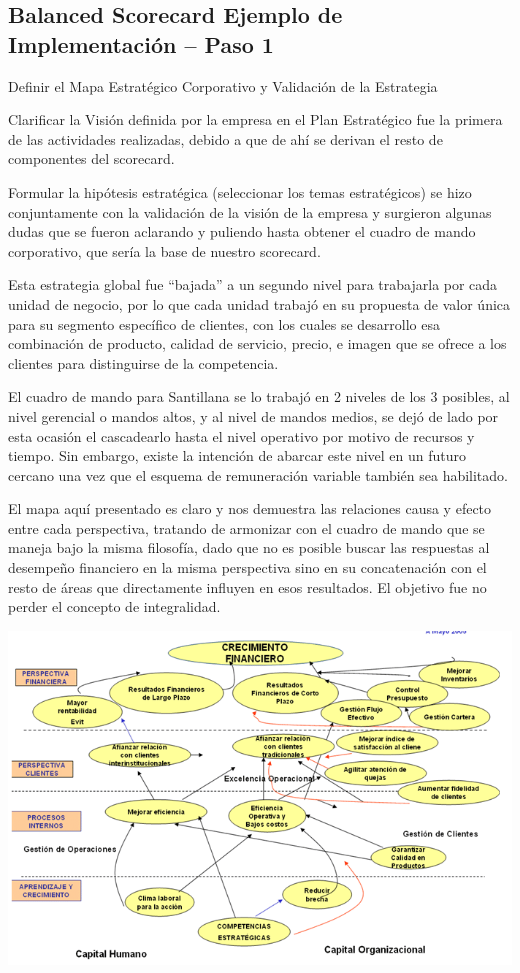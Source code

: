 \subsection{Balanced Scorecard Ejemplo de Implementación – Paso 1}
\item {Definir el Mapa Estratégico Corporativo y Validación de la Estrategia

Clarificar la Visión definida por la empresa en el Plan Estratégico fue la primera de las actividades realizadas, debido a que de ahí se derivan el resto de componentes del scorecard.

Formular la hipótesis estratégica (seleccionar los temas estratégicos) se hizo conjuntamente con la validación de la visión de la empresa y surgieron algunas dudas que se fueron aclarando y puliendo hasta obtener el cuadro de mando corporativo, que sería la base de nuestro scorecard.

Esta estrategia global fue “bajada” a un segundo nivel para trabajarla por cada unidad de negocio, por lo que cada unidad trabajó en su propuesta de valor única para su segmento específico de clientes, con los cuales se desarrollo esa combinación de producto, calidad de servicio, precio, e imagen que se ofrece a los clientes para distinguirse de la competencia.

El cuadro de mando para Santillana se lo trabajó en 2 niveles de los 3 posibles, al nivel gerencial o mandos altos, y al nivel de mandos medios, se dejó de lado por esta ocasión el cascadearlo hasta el nivel operativo por motivo de recursos y tiempo. Sin embargo, existe la intención de abarcar este nivel en un futuro cercano una vez que el esquema de remuneración variable también sea habilitado.

El mapa aquí presentado es claro y nos demuestra las relaciones causa y efecto entre cada perspectiva, tratando de armonizar con el cuadro de mando que se maneja bajo la misma filosofía, dado que no es posible buscar las respuestas al desempeño financiero en la misma perspectiva sino en su concatenación con el resto de áreas que directamente influyen en esos resultados. El objetivo fue no perder el concepto de integralidad.}

\begin{center}
\includegraphics[width=15cm]{./Imagenes/ImagenEmpresa3.png}
\end{center}

